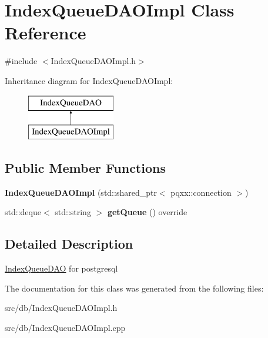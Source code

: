 \hypertarget{classIndexQueueDAOImpl}{}\section{Index\+Queue\+D\+A\+O\+Impl Class Reference}
\label{classIndexQueueDAOImpl}


{\ttfamily \#include $<$Index\+Queue\+D\+A\+O\+Impl.\+h$>$}

Inheritance diagram for Index\+Queue\+D\+A\+O\+Impl\+:\begin{figure}[H]
\begin{center}
\leavevmode
\includegraphics[height=2.000000cm]{classIndexQueueDAOImpl}
\end{center}
\end{figure}
\subsection*{Public Member Functions}
\begin{DoxyCompactItemize}
\item 
{\bfseries Index\+Queue\+D\+A\+O\+Impl} (std\+::shared\+\_\+ptr$<$ pqxx\+::connection $>$)\hypertarget{classIndexQueueDAOImpl_a8a3918e1a3cd95a4ce0235411c143d54}{}\label{classIndexQueueDAOImpl_a8a3918e1a3cd95a4ce0235411c143d54}

\item 
std\+::deque$<$ std\+::string $>$ {\bfseries get\+Queue} () override\hypertarget{classIndexQueueDAOImpl_a1da3bc0cefa3731ac3360d910f7f0088}{}\label{classIndexQueueDAOImpl_a1da3bc0cefa3731ac3360d910f7f0088}

\end{DoxyCompactItemize}


\subsection{Detailed Description}
\hyperlink{classIndexQueueDAO}{Index\+Queue\+D\+AO} for postgresql 

The documentation for this class was generated from the following files\+:\begin{DoxyCompactItemize}
\item 
src/db/Index\+Queue\+D\+A\+O\+Impl.\+h\item 
src/db/Index\+Queue\+D\+A\+O\+Impl.\+cpp\end{DoxyCompactItemize}

